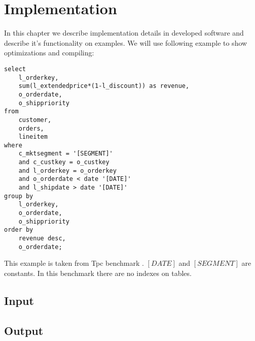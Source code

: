 \chapter{Implementation}

In this chapter we describe implementation details in developed software and describe it's functionality on examples. We will use following example to show optimizations and compiling:


\begin{verbatim}
select
    l_orderkey,
    sum(l_extendedprice*(1-l_discount)) as revenue,
    o_orderdate,
    o_shippriority
from
    customer,
    orders,
    lineitem
where
    c_mktsegment = '[SEGMENT]'
    and c_custkey = o_custkey
    and l_orderkey = o_orderkey
    and o_orderdate < date '[DATE]'
    and l_shipdate > date '[DATE]'
group by
    l_orderkey,
    o_orderdate,
    o_shippriority
order by
    revenue desc,
    o_orderdate;
\end{verbatim}

This example is taken from Tpc benchmark \cite{benchmark}. $[DATE]$ and $[SEGMENT]$ are constants. In this benchmark there are no indexes on tables.

\section{Input}



\section{Output}

